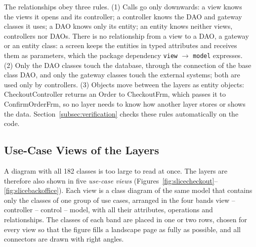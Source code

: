 The relationships obey three rules. (1) Calls go only downwards: a view knows the views it opens and its controller; a controller knows the DAO and gateway classes it uses; a DAO knows only its entity; an entity knows neither views, controllers nor DAOs. There is no relationship from a view to a DAO, a gateway or an entity class: a screen keeps the entities in typed attributes and receives them as parameters, which the package dependency \texttt{view} $\rightarrow$ \texttt{model} expresses. (2) Only the DAO classes touch the database, through the connection of the base class \textsf{DAO}, and only the gateway classes touch the external systems; both are used only by controllers. (3) Objects move between the layers as entity objects: \textsf{CheckoutController} returns an \textsf{Order} to \textsf{CheckoutFrm}, which passes it to \textsf{ConfirmOrderFrm}, so no layer needs to know how another layer stores or shows the data. Section~\ref{subsec:verification} checks these rules automatically on the code.

\subsection{Use-Case Views of the Layers}
\label{subsec:slices}
A diagram with all 182 classes is too large to read at once. The layers are therefore also shown in five \emph{use-case views} (Figures~\ref{fig:slicecheckout}--\ref{fig:slicebackoffice}). Each view is a class diagram of the same model that contains only the classes of one group of use cases, arranged in the four bands view -- controller -- control -- model, with all their attributes, operations and relationships. The classes of each band are placed in one or two rows, chosen for every view so that the figure fills a landscape page as fully as possible, and all connectors are drawn with right angles.

